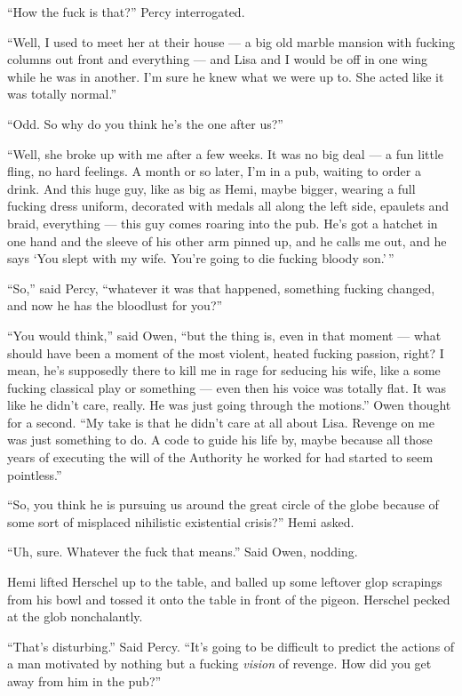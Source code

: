 \documentclass[
]{scrbook}
\begin{document}
``How the fuck is that?'' Percy interrogated.

``Well, I used to meet her at their house --- a big old marble mansion
with fucking columns out front and everything --- and Lisa and I would
be off in one wing while he was in another. I'm sure he knew what we
were up to. She acted like it was totally normal.''

``Odd. So why do you think he's the one after us?''

``Well, she broke up with me after a few weeks. It was no big deal --- a
fun little fling, no hard feelings. A month or so later, I'm in a pub,
waiting to order a drink. And this huge guy, like as big as Hemi, maybe
bigger, wearing a full fucking dress uniform, decorated with medals all
along the left side, epaulets and braid, everything --- this guy comes
roaring into the pub. He's got a hatchet in one hand and the sleeve of
his other arm pinned up, and he calls me out, and he says `You slept
with my wife. You're going to die fucking bloody son.'\,''

``So,'' said Percy, ``whatever it was that happened, something fucking
changed, and now he has the bloodlust for you?''

``You would think,'' said Owen, ``but the thing is, even in that moment
--- what should have been a moment of the most violent, heated fucking
passion, right? I mean, he's supposedly there to kill me in rage for
seducing his wife, like a some fucking classical play or something ---
even then his voice was totally flat. It was like he didn't care,
really. He was just going through the motions.'' Owen thought for a
second. ``My take is that he didn't care at all about Lisa. Revenge on
me was just something to do. A code to guide his life by, maybe because
all those years of executing the will of the Authority he worked for had
started to seem pointless.''

``So, you think he is pursuing us around the great circle of the globe
because of some sort of misplaced nihilistic existential crisis?'' Hemi
asked.

``Uh, sure. Whatever the fuck that means.'' Said Owen, nodding.

Hemi lifted Herschel up to the table, and balled up some leftover glop
scrapings from his bowl and tossed it onto the table in front of the
pigeon. Herschel pecked at the glob nonchalantly.

``That's disturbing.'' Said Percy. ``It's going to be difficult to
predict the actions of a man motivated by nothing but a fucking
\emph{vision} of revenge. How did you get away from him in the pub?''
\end{document}
